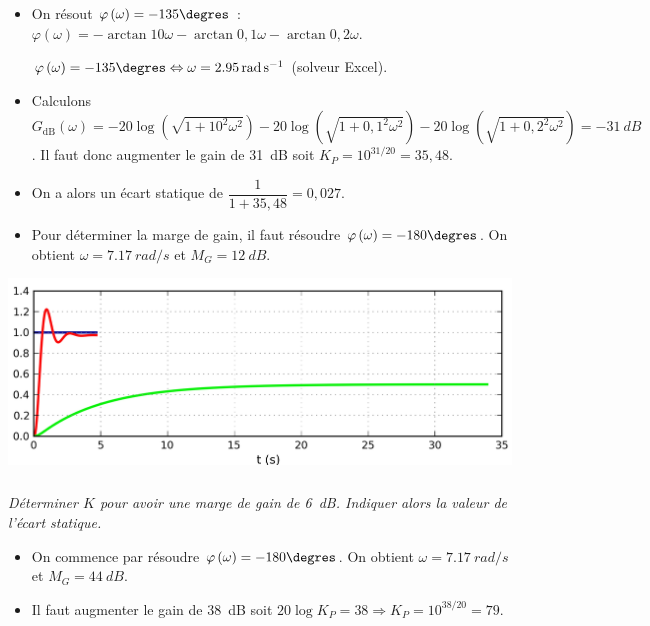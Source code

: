 \documentclass[10pt,fleqn]{article} %
\begin{document}
\begin{multicols}{2}
\begin{corrige}
\begin{itemize}
\item On résout $\varphi\left(\omega\right)=-135\degres$ : 
$\varphi\left(\omega\right)=-\arctan 10\omega-\arctan 0,1\omega-\arctan 0,2\omega$.

$\varphi\left(\omega\right)=-135\degres \Leftrightarrow \omega = \SI{2,95}{rad.s^{-1}}$ (solveur Excel). 

\item Calculons $G_{\text{dB}}(\omega)=-20\log\left(\sqrt{1+10^2\omega^2} \right)-20\log\left(\sqrt{1+0,1^2\omega^2} \right)-20\log\left(\sqrt{1+0,2^2\omega^2} \right)=\SI{-31}{dB}$. Il faut donc augmenter le gain de \SI{31}{dB} soit $K_P=10^{31/20}=35,48$.


\item On a alors un écart statique de $\dfrac{1}{1+35,48}=0,027$.

\item Pour déterminer la marge de gain, il faut résoudre $\varphi\left(\omega\right)=-180\degres$. On obtient $\omega=\SI{7,17}{rad/s}$ et $M_G=\SI{12}{dB}$.
\end{itemize}


\begin{center}
\includegraphics[width=.9\linewidth]{images/01_02}
\end{center}

\end{corrige}
\else
\fi


\subparagraph{}\textit{Déterminer $K$ pour avoir une marge de gain de \SI{6}{dB}. Indiquer alors la valeur de l'écart statique.}
\ifprof
\begin{corrige}
\begin{itemize}
\item On commence par résoudre $\varphi\left(\omega\right)=-180\degres$. On obtient $\omega=\SI{7,17}{rad/s}$ et $M_G=\SI{44}{dB}$.

\item Il faut augmenter le gain de \SI{38}{dB} soit $20\log K_P=38\Rightarrow K_P=10^{38/20}=79$.



\end{itemize}
\end{corrige}
\end{multicols}
\end{document}
